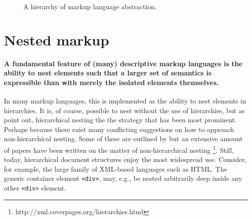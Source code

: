 \documentclass{scrreprt}
\begin{document}
\begin{figure}[h]
\centering


\caption{A hierarchy of markup language abstraction.}
\label{fig:markup-types-hierarchy}
\end{figure}













\section{Nested markup}
\label{sec:nesting}
\paragraph{A fundamental feature of (many) descriptive markup languages is the ability to nest elements such that a larger set of semantics is expressible than with merely the isolated elements themselves.} In many markup languages, this is implemented as the ability to nest elements in hierarchies. It is, of course, possible to nest without the use of hierarchies, but as \citet*{durand} point out, hierarchical nesting the the strategy that has been most prominent. Perhaps because there exist many conflicting suggestions on how to approach non-hierarchical nesting. Some of these are outlined by \citet{durand} but an extensive amount of papers have been written on the matter of non-hierarchical nesting \footnote{ http://xml.coverpages.org/hierarchies.html}. Still, today, hierarchical document structures enjoy the most widespread use. Consider, for example, the large family of XML-based languages such as HTML. The generic container element \texttt{<div>}, may, e.g., be nested arbitrarily deep inside any other \texttt{<div>} element.
\end{document}
